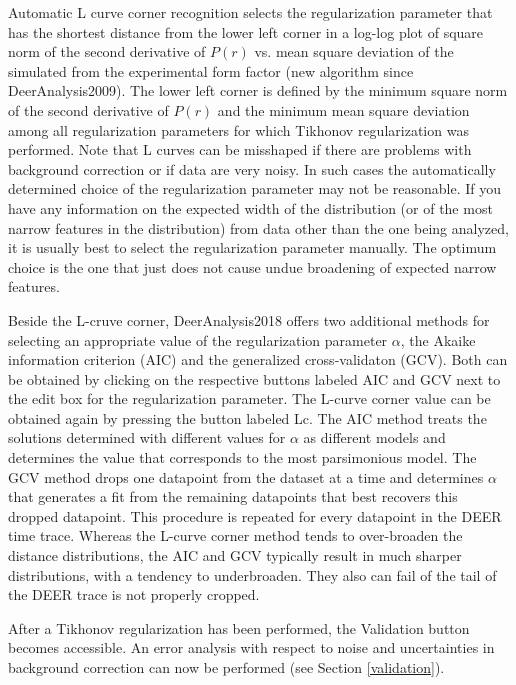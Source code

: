\documentclass{article}
\begin{document}
Automatic L curve corner recognition selects the regularization parameter that has the shortest distance from the lower left corner in a log-log plot of square norm of the second derivative of $P(r)$ vs. mean square deviation of the simulated from the experimental form factor (new algorithm since DeerAnalysis2009). The lower left corner is defined by the minimum square norm of the second derivative of $P(r)$ and the minimum mean square deviation among all regularization parameters for which Tikhonov regularization was performed. Note that L curves can be misshaped if there are problems with background correction or if data are very noisy. In such cases the automatically determined choice of the regularization parameter may not be reasonable. If you have any information on the expected width of the distribution (or of the most narrow features in the distribution) from data other than the one being analyzed, it is usually best to select the regularization parameter manually. The optimum choice is the one that just does not cause undue broadening of expected narrow features.

Beside the L-cruve corner, DeerAnalysis2018 offers two additional methods for selecting an appropriate value of the regularization parameter $\alpha$, the Akaike information criterion (AIC) and the generalized cross-validaton (GCV)\cite{edwards2018}. Both can be obtained by clicking on the respective buttons labeled {\ttfamily AIC} and {\ttfamily GCV} next to the edit box for the regularization parameter. The L-curve corner value can be obtained again by pressing the button labeled {\ttfamily Lc}. The AIC method treats the solutions determined with different values for $\alpha$ as different models and determines the value that corresponds to the most parsimonious model. The GCV method drops one datapoint from the dataset at a time and determines $\alpha$ that generates a fit from the remaining datapoints that best recovers this dropped datapoint. This procedure is repeated for every datapoint in the DEER time trace. Whereas the L-curve corner method  tends to over-broaden the distance distributions, the AIC and GCV typically result in much sharper distributions, with a tendency to underbroaden. They also can fail of the tail of the DEER trace is not properly cropped.

After a Tikhonov regularization has been performed, the {\ttfamily Validation} button becomes accessible. An error analysis with respect to noise and uncertainties in background correction can now be performed (see Section \ref{validation}).
\end{document}
